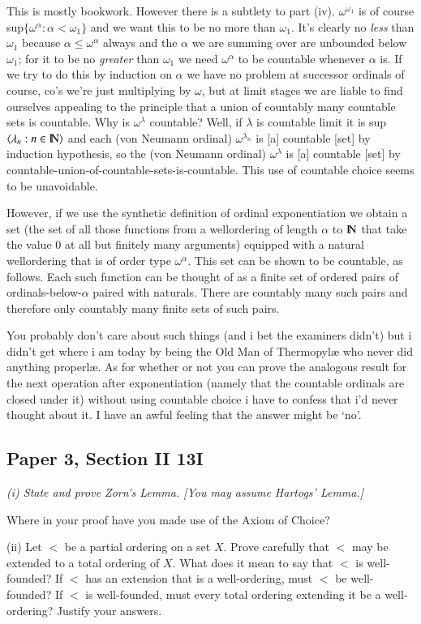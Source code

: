 \documentclass{book}
\begin{document}
This is mostly bookwork.  However there is a subtlety to part (iv).
$\omega^{\omega_1}$ is of course sup$\{\omega^\alpha: \alpha <
\omega_1\}$ and we want this to be no more than $\omega_1$.  It's
clearly no {\sl less} than $\omega_1$ because $\alpha \leq
\omega^\alpha$ always and the $\alpha$ we are summing over are
unbounded below $\omega_1$; for it to be no {\sl greater} than
$\omega_1$ we need $\omega^\alpha$ to be countable whenever $\alpha$
is.  If we try to do this by induction on $\alpha$ we have no problem
at successor ordinals of course, co's we're just multiplying by
$\omega$, but at limit stages we are liable to find ourselves appealing
to the principle that a union of countably many countable sets is
countable.  Why is $\omega^\lambda$ countable?  Well, if $\lambda$ is
countable limit it is sup$\mbox{$\langle \lambda_n: n\in \hbox{\rm I\negthinspace N} \rangle$}$ and each (von
Neumann ordinal) $\omega^{\lambda_n}$ is [a] countable [set] by induction 
hypothesis, so the (von Neumann ordinal) $\omega^{\lambda}$ is [a] 
countable [set] by countable-union-of-countable-sets-is-countable.  
This use of countable choice seems to be unavoidable.

However, if we use the synthetic definition of ordinal exponentiation
we obtain a set (the set of all those functions from a wellordering of 
length $\alpha$ to $\hbox{\rm I\negthinspace N}$ that take the value $0$ at all but finitely 
many arguments) equipped with a natural wellordering that is of order
type $\omega^\alpha$.  This set can be shown to be countable, as follows.  
Each such function can be thought of as a finite set of ordered pairs 
of ordinals-below-$\alpha$ paired with naturals.  There are countably 
many such pairs and therefore only countably many finite sets of such pairs.

\medskip

You probably don't care about such things (and i bet the examiners
didn't) but i didn't get where i am today by being the Old Man of Thermopyl{\ae} who never did
anything properl{\ae}.  As for whether or not you can prove the
analogous result for the next operation after exponentiation (namely
that the countable ordinals are closed under it) without using
countable choice i have to confess that i'd never thought about it.  I
have an awful feeling that the answer might be `no'.

\subsection*{Paper 3, Section II 13I}

{\sl (i) State and prove Zorn's Lemma.  [You may assume Hartogs' Lemma.]  

Where in your proof have you made use of the Axiom of Choice?

(ii) Let $<$ be a partial ordering on a set $X$.  Prove carefully that
$<$ may be extended to a total ordering of $X$.  What does it mean to
say that $<$ is well-founded?  If $<$ has an extension that is a
well-ordering, must $<$ be well-founded?  If $<$ is well-founded, must
every total ordering extending it be a well-ordering?  Justify your
answers.}
\end{document}
